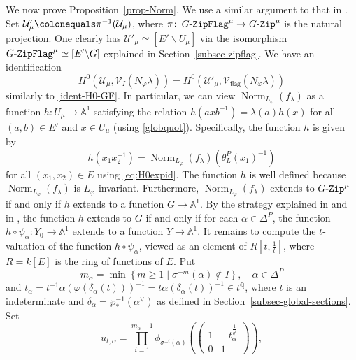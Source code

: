 \documentclass[11pt]{amsart}
\numberwithin{equation}{section}
\theoremstyle{definition}
\theoremstyle{remark}
\newcommand{\GZip}{\mathop{\text{$G$-{\tt Zip}}}\nolimits}
\newcommand{\flag}{\mathsf{flag}}
\newcommand{\GF}{\mathop{\text{$G$-{\tt ZipFlag}}}\nolimits}
\newcommand{\Ucal}{{\mathcal U}}
\newcommand{\Vcal}{{\mathcal V}}
\renewcommand{\AA}{\mathbb{A}}
\newcommand{\QQ}{\mathbb{Q}}
\DeclareMathOperator{\Norm}{Norm}
\begin{document}
We now prove Proposition~\ref{prop-Norm}. We use a similar argument to that in \cite[Theorem 3.5.3]{Koskivirta-automforms-GZip}. Set $\Ucal'_\mu\colonequals\pi^{-1}(\Ucal_\mu)$, where $\pi\colon \GF^\mu\to \GZip^\mu$ is the natural projection. One  clearly has $\Ucal'_\mu\simeq [E'\backslash U_\mu]$ via the isomorphism $\GF^\mu\simeq [E'\backslash G]$ explained in Section~\ref{subsec-zipflag}. We have an identification
\begin{equation}
    H^0\left(\Ucal_\mu,\Vcal_I\left(N_\varphi\lambda\right)\right)=H^0\left(\Ucal'_\mu,\Vcal_{\flag}\left(N_{\varphi}\lambda\right)\right)
\end{equation}
similarly to \eqref{ident-H0-GF}. In particular, we can view $\Norm_{L_\varphi}(f_{\lambda})$ as a function $h\colon U_\mu\to \AA^1$ satisfying the relation $h(axb^{-1})=\lambda(a)h(x)$ for all $(a,b)\in E'$ and $x\in U_\mu$ (using \eqref{globquot}). Specifically, the function $h$ is given by 
\begin{equation}\label{functionh-eq}
  h\left(x_1x_2^{-1}\right)=\Norm_{L_\varphi}(f_\lambda)\left(\theta_L^P(x_1)^{-1}\right)
\end{equation}
for all $(x_1,x_2)\in E$ using \eqref{eq:H0expid}. 
The function $h$ is well defined because $\Norm_{L_\varphi}(f_\lambda)$ is $L_\varphi$-invariant. Furthermore, $\Norm_{L_\varphi}(f_\lambda)$ extends to $\GZip^\mu$ if and only if $h$ extends to a function $G\to \AA^1$. By the strategy explained in \cite[Section~3.2]{Koskivirta-automforms-GZip} and in \cite[Section~3.1]{Imai-Koskivirta-vector-bundles}, the function $h$ extends to $G$ if and only if for each $\alpha\in \Delta^P$, the function $h\circ \psi_\alpha \colon Y_0\to \AA^1$ extends to a function $Y\to \AA^1$. It remains to compute the $t$-valuation of the function $h\circ \psi_\alpha$, viewed as an element of $R[t,\frac{1}{t}]$, where $R=k[E]$ is the ring of functions of $E$. Put 
\begin{equation}\label{malpha-equ}
 m_{\alpha} =\min \left\{ m \geq 1 \mid 
 \sigma^{-m}(\alpha) \notin I \right\}, \quad \alpha \in \Delta^P
\end{equation}
and $t_{\alpha}=t^{-1}\alpha(\varphi(\delta_{\alpha}(t)))^{-1} =t \alpha(\delta_{\alpha}(t))^{-1} \in t^{\QQ}$, where $t$ is an indeterminate and $\delta_{\alpha}=\wp_*^{-1}(\alpha^{\vee})$ as defined in Section~\ref{subsec-global-sections}. Set
\[
 u_{t,\alpha}=\prod_{i=1}^{m_{\alpha}-1} \phi_{\sigma^{-i}(\alpha)} 
 \left( \begin{pmatrix}
1&-t_{\alpha}^{\frac{1}{q^i}}\\0&1
\end{pmatrix} \right),  
\]
\end{document}
